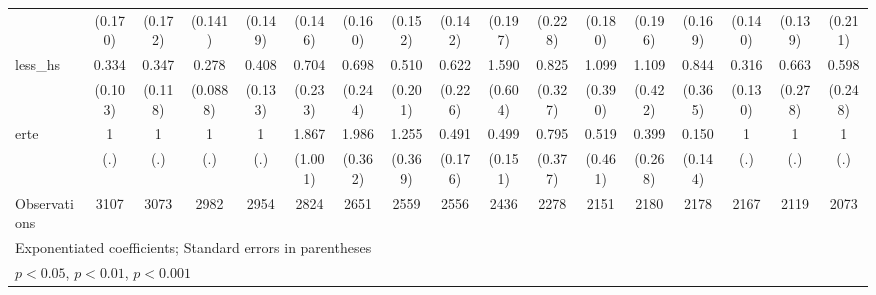 {\begin{tabular}{l*{16}{c}}
                    &     (0.170)         &     (0.172)         &     (0.141)         &     (0.149)         &     (0.146)         &     (0.160)         &     (0.152)         &     (0.142)         &     (0.197)         &     (0.228)         &     (0.180)         &     (0.196)         &     (0.169)         &     (0.140)         &     (0.139)         &     (0.211)         \\
[1em]
less\_hs             &       0.334\sym{***}&       0.347\sym{**} &       0.278\sym{***}&       0.408\sym{**} &       0.704         &       0.698         &       0.510         &       0.622         &       1.590         &       0.825         &       1.099         &       1.109         &       0.844         &       0.316\sym{**} &       0.663         &       0.598         \\
                    &     (0.103)         &     (0.118)         &    (0.0888)         &     (0.133)         &     (0.233)         &     (0.244)         &     (0.201)         &     (0.226)         &     (0.604)         &     (0.327)         &     (0.390)         &     (0.422)         &     (0.365)         &     (0.130)         &     (0.278)         &     (0.248)         \\
[1em]
erte                &           1         &           1         &           1         &           1         &       1.867         &       1.986\sym{***}&       1.255         &       0.491\sym{*}  &       0.499\sym{*}  &       0.795         &       0.519         &       0.399         &       0.150\sym{*}  &           1         &           1         &           1         \\
                    &         (.)         &         (.)         &         (.)         &         (.)         &     (1.001)         &     (0.362)         &     (0.369)         &     (0.176)         &     (0.151)         &     (0.377)         &     (0.461)         &     (0.268)         &     (0.144)         &         (.)         &         (.)         &         (.)         \\
\hline
Observations        &        3107         &        3073         &        2982         &        2954         &        2824         &        2651         &        2559         &        2556         &        2436         &        2278         &        2151         &        2180         &        2178         &        2167         &        2119         &        2073         \\
\hline\hline
\multicolumn{17}{l}{\footnotesize Exponentiated coefficients; Standard errors in parentheses}\\
\multicolumn{17}{l}{\footnotesize \sym{*} \(p<0.05\), \sym{**} \(p<0.01\), \sym{***} \(p<0.001\)}\\
\end{tabular}
}
